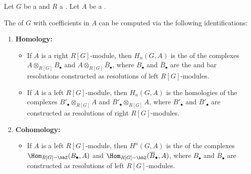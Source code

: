 \begin{corollary} \label{corollary:group_homology_cohomology_of_a_module_over_a_group_ring_over_a_ring_can_be_computed_by_bar_resolutions}
Let $G$ be a  and $R$ a . Let $A$ be a .

The  of $G$ with coefficients in $A$ can be computed via the following identifications:

\begin{enumerate}
    \item \textbf{Homology:} 
    \begin{itemize}

        \item If $A$ is a right $R[G]$-module, then $H_n(G, A)$ is the  of the complexes $A \otimes_{R[G]} B_\bullet$ and $A \otimes_{R[G]} \overline{B}_\bullet$, where $B_\bullet$ and $\overline{B}_\bullet$ are the  and  bar resolutions constructed as resolutions of left $R[G]$-modules.
        
        \item If $A$ is a left $R[G]$-module, then $H_n(G, A)$ is the homologies of the complexes $B'_\bullet \otimes_{R[G]} A$ and $\overline{B}'_\bullet \otimes_{R[G]} A$, where $B'_\bullet$ and $\overline{B}'_\bullet$ are constructed as resolutions of right $R[G]$-modules.
    
    \end{itemize}

    \item \textbf{Cohomology:}
    
    \begin{itemize}
        \item If $A$ is a left $R[G]$-module, then $H^n(G, A)$ is the  of the complexes $\Hom_{R[G]-\bbZ}(B_\bullet, A)$ and $\Hom_{R[G]-\bbZ}(\overline{B}_\bullet, A)$, where $B_\bullet$ and $\overline{B}_\bullet$ are constructed as resolutions of left $R[G]$-modules.
        

\end{itemize}
\end{enumerate}
\end{corollary}
